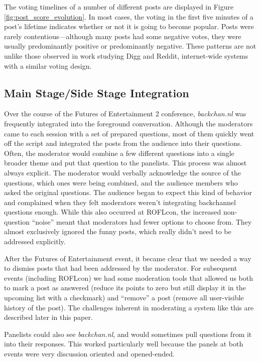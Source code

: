 The voting timelines of a number of different posts are displayed in Figure \ref{fig:post_score_evolution}. In most cases, the voting in the first five minutes of a post's lifetime indicates whether or not it is going to become popular. Posts were rarely contentious---although many posts had some negative votes, they were usually predominantly positive or predominantly negative. These patterns are not unlike those observed in work studying Digg and Reddit, internet-wide systems with a similar voting design. \citep{Lerman:2006wq}


\subsection{Main Stage/Side Stage Integration}
Over the course of the Futures of Entertainment 2 conference, \emph{backchan.nl} was frequently integrated into the foreground conversation. Although the moderators came to each session with a set of prepared questions, most of them quickly went off the script and integrated the posts from the audience into their questions. Often, the moderator would combine a few different questions into a single broader theme and put that question to the panelists. This process was almost always explicit. The moderator would verbally acknowledge the source of the questions, which ones were being combined, and the audience members who asked the original questions. The audience began to expect this kind of behavior and complained when they felt moderators weren't integrating backchannel questions enough. While this also occurred at ROFLcon, the increased non-question ``noise'' meant that moderators had fewer options to choose from. They almost exclusively ignored the funny posts, which really didn't need to be addressed explicitly.

After the Futures of Entertainment event, it became clear that we needed a way to dismiss posts that had been addressed by the moderator. For subsequent events (including ROFLcon) we had some moderation tools that allowed us both to mark a post as answered (reduce its points to zero but still display it in the upcoming list with a checkmark) and ``remove'' a post (remove all user-visible history of the post). The challenges inherent in moderating a system like this are described later in this paper.

Panelists could also see \emph{backchan.nl}, and would sometimes pull questions from it into their responses. This worked particularly well because the panels at both events were very discussion oriented and opened-ended.

